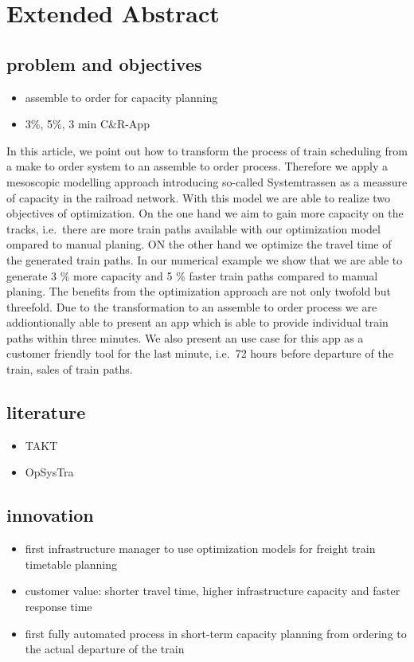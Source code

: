 \section{Extended Abstract}
\label{chap:extAbs}

\subsection{problem and objectives}
\begin{itemize}
  \item assemble to order for capacity planning
  \item 3\%, 5\%, 3 min C\&R-App
\end{itemize}
In this article, we point out how to transform the process of train scheduling from a make to order system to an assemble to order process. Therefore we apply a mesoscopic modelling approach introducing so-called Systemtrassen as a meassure of capacity in the railroad network. With this model we are able to realize two objectives of optimization. On the one hand we aim to gain more capacity on the tracks, i.e.\ there are more train paths available with our optimization model ompared to manual planing. ON the other hand we optimize the travel time of the generated train paths. In our numerical example we show that we are able to generate 3 \% more capacity and 5 \% faster train paths compared to manual planing. The benefits from the optimization approach are not only twofold but threefold. Due to the transformation to an assemble to order process we are addiontionally able to present an app which is able to provide individual train paths within three minutes. We also present an use case for this app as a customer friendly tool for the last minute, i.e.\ 72 hours before departure of the train, sales of train paths.
\subsection{literature}
\begin{itemize}
  \item TAKT
  \item OpSysTra
\end{itemize}

\subsection{innovation}
\begin{itemize}
  \item first infrastructure manager to use optimization models for freight train timetable planning
  \item customer value: shorter travel time, higher infrastructure capacity and faster response time
  \item first fully automated process in short-term capacity planning from ordering to the actual departure of the train
\end{itemize}

